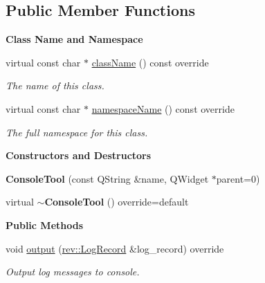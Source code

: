 \subsection*{Public Member Functions}
\begin{Indent}\textbf{ Class Name and Namespace}\par
\begin{DoxyCompactItemize}
\item 
virtual const char $\ast$ \mbox{\hyperlink{classrev_1_1_view_1_1_console_tool_abffa7bd8ebee59a74578c046ded1fb70}{class\+Name}} () const override
\begin{DoxyCompactList}\small\item\em The name of this class. \end{DoxyCompactList}\item 
virtual const char $\ast$ \mbox{\hyperlink{classrev_1_1_view_1_1_console_tool_a8168c00a344099bff9626a775408aac4}{namespace\+Name}} () const override
\begin{DoxyCompactList}\small\item\em The full namespace for this class. \end{DoxyCompactList}\end{DoxyCompactItemize}
\end{Indent}
\begin{Indent}\textbf{ Constructors and Destructors}\par
\begin{DoxyCompactItemize}
\item 
\mbox{\label{classrev_1_1_view_1_1_console_tool_a798f0c985ba008eab01ab45763a0649d}} 
{\bfseries Console\+Tool} (const Q\+String \&name, Q\+Widget $\ast$parent=0)
\item 
\mbox{\label{classrev_1_1_view_1_1_console_tool_a2e30b513bb43c48661c928b20f46a811}} 
virtual {\bfseries $\sim$\+Console\+Tool} () override=default
\end{DoxyCompactItemize}
\end{Indent}
\begin{Indent}\textbf{ Public Methods}\par
\begin{DoxyCompactItemize}
\item 
void \mbox{\hyperlink{classrev_1_1_view_1_1_console_tool_ac8f85a1067d6aa26f66a89e475d1f24a}{output}} (\mbox{\hyperlink{classrev_1_1_log_record}{rev\+::\+Log\+Record}} \&log\+\_\+record) override
\begin{DoxyCompactList}\small\item\em Output log messages to console. \end{DoxyCompactList}\end{DoxyCompactItemize}
\end{Indent}
